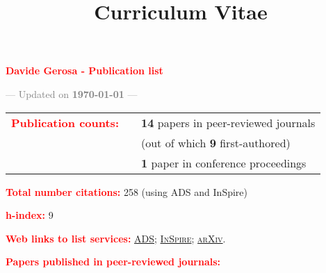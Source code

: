 \documentclass[11pt,a4paper,sans]{moderncv}   %
\title{Curriculum Vitae}
\begin{document}
\textcolor{red}{\begin{center}{\huge  \textbf{Davide Gerosa - Publication list}}\end{center}}

\vspace{-0.5cm}

\begin{center}\textcolor{gray}{ --- Updated on \textbf{\today} ---}\end{center}
\begin{tabular}{rcl}
\textcolor{red}{\textbf{Publication counts:}}&\hspace{0.3cm} &{\textbf{14} papers in peer-reviewed journals} \\
& &{(out of which \textbf{9} first-authored)}
 \\
& &{\textbf{1} paper in conference proceedings}
\end{tabular}

\textcolor{red}{\textbf{Total number citations:}} \textbf{} 258 (using ADS and InSpire)

\textcolor{red}{\textbf{h-index:}} 9

\textcolor{red}{\textbf{Web links to list services:}}
\href{http://labs.adsabs.harvard.edu/adsabs/search/?q=author%3A%22Gerosa%2C+Davide%22&month_from=&year_from=&month_to=&year_to=&db_f=&nr=&article=1&bigquery=&re_sort_type=CITED&re_sort_dir=desc}{\textsc{ADS}}; 
\href{http://inspirehep.net/search?ln=en&ln=en&p=exactauthor%3AD.Gerosa.1&of=hb&action_search=Search&sf=&so=d&rm=citation&rg=25&sc=0}{\textsc{InSpire}}; 
\href{http://arxiv.org/a/gerosa_d_1.html}{\textsc{arXiv}}.
\vspace{0.5cm}

\textcolor{red}{\textbf{Papers published in peer-reviewed journals:}}
\vspace{-0.5cm}
\end{document}
